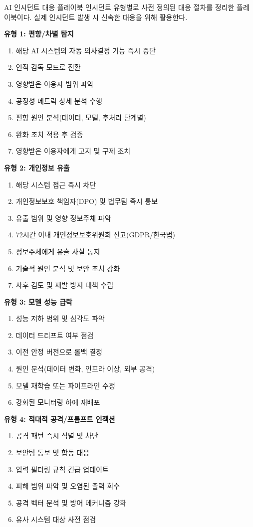 \begin{practicaltool}{AI 인시던트 대응 플레이북}
인시던트 유형별로 사전 정의된 대응 절차를 정리한 플레이북이다. 실제 인시던트 발생 시 신속한 대응을 위해 활용한다.

\textbf{유형 1: 편향/차별 탐지}
\begin{enumerate}
 \item 해당 AI 시스템의 자동 의사결정 기능 즉시 중단
 \item 인적 감독 모드로 전환
 \item 영향받은 이용자 범위 파악
 \item 공정성 메트릭 상세 분석 수행
 \item 편향 원인 분석(데이터, 모델, 후처리 단계별)
 \item 완화 조치 적용 후 검증
 \item 영향받은 이용자에게 고지 및 구제 조치
\end{enumerate}

\textbf{유형 2: 개인정보 유출}
\begin{enumerate}
 \item 해당 시스템 접근 즉시 차단
 \item 개인정보보호 책임자(DPO) 및 법무팀 즉시 통보
 \item 유출 범위 및 영향 정보주체 파악
 \item 72시간 이내 개인정보보호위원회 신고(GDPR/한국법)
 \item 정보주체에게 유출 사실 통지
 \item 기술적 원인 분석 및 보안 조치 강화
 \item 사후 검토 및 재발 방지 대책 수립
\end{enumerate}

\textbf{유형 3: 모델 성능 급락}
\begin{enumerate}
 \item 성능 저하 범위 및 심각도 파악
 \item 데이터 드리프트 여부 점검
 \item 이전 안정 버전으로 롤백 결정
 \item 원인 분석(데이터 변화, 인프라 이상, 외부 공격)
 \item 모델 재학습 또는 파이프라인 수정
 \item 강화된 모니터링 하에 재배포
\end{enumerate}

\textbf{유형 4: 적대적 공격/프롬프트 인젝션}
\begin{enumerate}
 \item 공격 패턴 즉시 식별 및 차단
 \item 보안팀 통보 및 합동 대응
 \item 입력 필터링 규칙 긴급 업데이트
 \item 피해 범위 파악 및 오염된 출력 회수
 \item 공격 벡터 분석 및 방어 메커니즘 강화
 \item 유사 시스템 대상 사전 점검
\end{enumerate}
\end{practicaltool}

